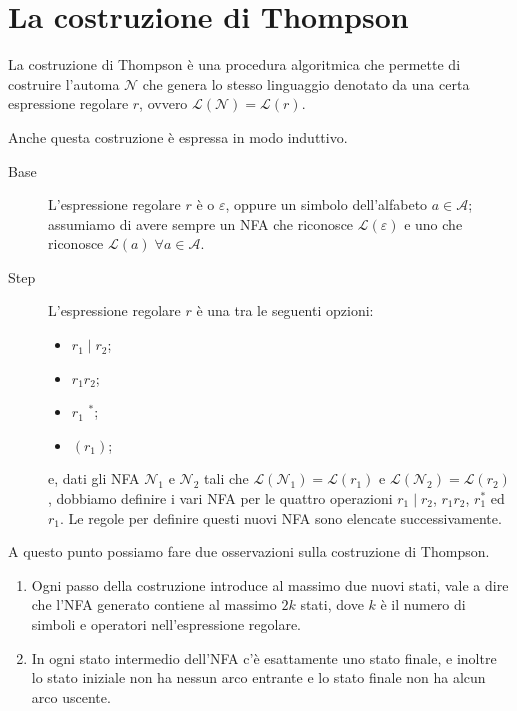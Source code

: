\documentclass[class=book, crop=false, oneside, 12pt]{standalone}
\begin{document}
\section{La costruzione di Thompson}
La costruzione di Thompson è una procedura algoritmica che permette di costruire l’automa \(\mathcal{N}\) che genera lo stesso linguaggio denotato da una certa espressione regolare \(r\), ovvero \(\mathcal{L}(\mathcal{N}) = \mathcal{L}(r)\).

Anche questa costruzione è espressa in modo induttivo.

\begin{description}
    \item[Base] L'espressione regolare \(r\) è o \(\varepsilon\), oppure un simbolo dell’alfabeto \(a \in \mathcal{A}\); assumiamo di avere sempre un NFA che riconosce \(\mathcal{L}(\varepsilon)\) e uno che riconosce \(\mathcal{L}(a) \; \forall a \in \mathcal{A}\).
    \item[Step] L'espressione regolare \(r\) è una tra le seguenti opzioni: 
    \begin{itemize}[noitemsep]
        \item \(r_1 \mid  r_2 \);
        \item \( r_1 r_2 \); 
        \item \( r_1\) \(^\ast \);
        \item \((r_1)\);
    \end{itemize}
    e, dati gli NFA \(\mathcal{N}_1\) e \(\mathcal{N}_2\) tali che \(\mathcal{L}(\mathcal{N}_1)=\mathcal{L}(r_1)\) e \(\mathcal{L}(\mathcal{N}_2)=\mathcal{L}(r_2)\), dobbiamo definire i vari NFA per le quattro operazioni \(r_1 \mid r_2\), \(r_1 r_2\), \(r_1^*\) ed \(r_1\). Le regole per definire questi nuovi NFA sono elencate successivamente.
\end{description}

\noindent A questo punto possiamo fare due osservazioni sulla costruzione di Thompson.

\begin{enumerate}
    \item Ogni passo della costruzione introduce al massimo due nuovi stati, vale a dire che l’NFA generato contiene al massimo \(2k\) stati, dove \(k\) è il numero di simboli e operatori nell’espressione regolare.
    \item In ogni stato intermedio dell’NFA c’è esattamente uno stato finale, e inoltre lo stato iniziale non ha nessun arco entrante e lo stato finale non ha alcun arco uscente. 
\end{enumerate}
\end{document}
